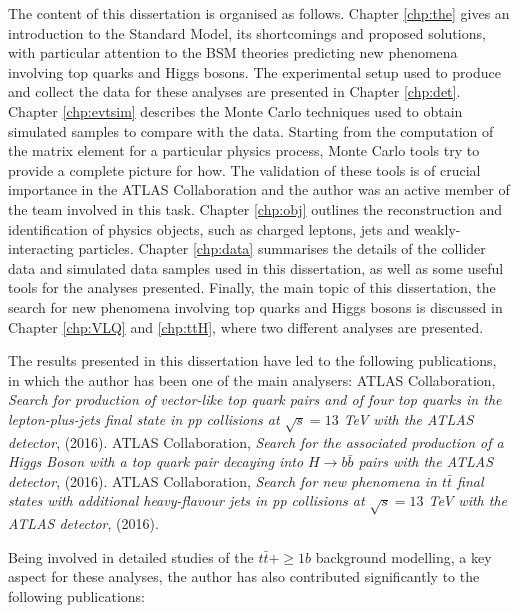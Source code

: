 \par The content of this dissertation is organised as follows. Chapter \ref{chp:the} gives an introduction to the Standard Model, its shortcomings and proposed solutions, with particular attention to the BSM theories predicting new phenomena involving top quarks and Higgs bosons. The experimental setup used to produce and collect the data for these analyses are presented in Chapter \ref{chp:det}. Chapter \ref{chp:evtsim} describes the Monte Carlo techniques used to obtain simulated samples to compare with the data. Starting from the computation of the matrix element for a particular physics process,  Monte Carlo tools try to provide a complete picture for how. The validation of these tools is of crucial importance in the ATLAS Collaboration and the author was an active member of the team involved in this task. Chapter \ref{chp:obj} outlines the reconstruction and identification of physics objects, such as charged leptons, jets and weakly-interacting particles. Chapter \ref{chp:data} summarises the details of the collider data and simulated data samples used in this dissertation, as well as some useful tools for the analyses presented. Finally, the main topic of this dissertation, the search for new phenomena involving top quarks and Higgs bosons is discussed in Chapter \ref{chp:VLQ} and \ref{chp:ttH}, where two different analyses are presented.\par
The results presented in this dissertation have led to the following publications, in which the author has been one of the main analysers:
\bi
\ib ATLAS Collaboration, \emph{Search for production of vector-like top quark pairs and of four top quarks in the lepton-plus-jets final state in pp collisions at $\sqrt{s} =13$ TeV with the ATLAS detector},  (2016).
\ib ATLAS Collaboration, \emph{Search for the associated production of a Higgs Boson with a top quark pair decaying into $H\to b\bar{b}$ pairs with the ATLAS detector},  (2016).
\ib ATLAS Collaboration, \emph{Search for new phenomena in $t\bar{t}$ final states with additional heavy-flavour jets in pp collisions at $\sqrt{s}=13$ TeV with the ATLAS detector},  (2016). 
\ei

\noindent Being involved in detailed studies of the $t\bar{t}+\ge1b$ background modelling, a key aspect for these analyses, the author has also contributed significantly to the following publications:

